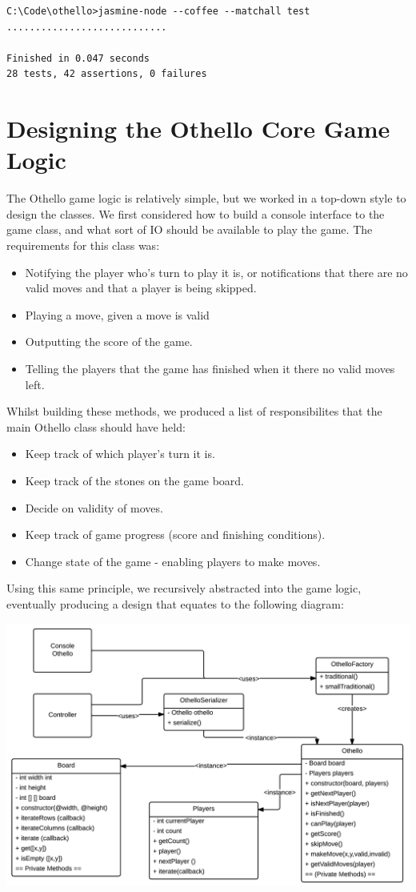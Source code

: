 \documentclass[a4wide, 11pt]{article}
\begin{document}
\begin{verbatim}
C:\Code\othello>jasmine-node --coffee --matchall test
............................

Finished in 0.047 seconds
28 tests, 42 assertions, 0 failures
\end{verbatim}

\section{Designing the Othello Core Game Logic}

The Othello game logic is relatively simple, but we worked in a top-down style to design the classes. We first considered how to build a console interface to the game class, and what sort of IO should be available to play the game. The requirements for this class was:
\begin{itemize}
\item Notifying the player who's turn to play it is, or notifications that there are no valid moves and that a player is being skipped.
\item Playing a move, given a move is valid
\item Outputting the score of the game.
\item Telling the players that the game has finished when it there no valid moves left.
\end{itemize}
Whilst building these methods, we produced a list of responsibilites that the main Othello class should have held:
\begin{itemize}
\item Keep track of which player's turn it is.
\item Keep track of the stones on the game board.
\item Decide on validity of moves.
\item Keep track of game progress (score and finishing conditions).
\item Change state of the game - enabling players to make moves.
\end{itemize}
Using this same principle, we recursively abstracted into the game logic, eventually producing a design that equates to the following diagram:

\includegraphics[width=\textwidth]{OthelloGameClassDiagram.png}
\end{document}
